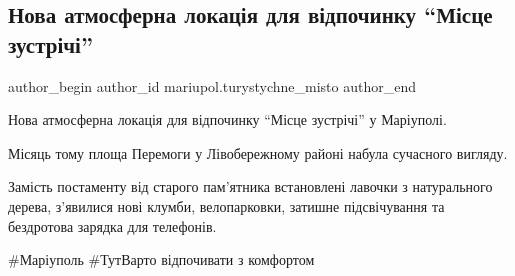  
 
 
 
 

\subsection{Нова атмосферна локація для відпочинку \enquote{Місце зустрічі}}
\label{sec:21_10_2021.fb.mariupol.turystychne_misto.1.nova_atmosferna_lokacia_misce_zustrichi}

\ifcmt
 author_begin
   author_id mariupol.turystychne_misto
 author_end
\fi

Нова атмосферна локація для відпочинку \enquote{Місце зустрічі} у Маріуполі. 

Місяць тому площа Перемоги у Лівобережному районі набула сучасного вигляду.

Замість постаменту від старого пам'ятника встановлені лавочки з натурального
дерева, з'явилися нові клумби, велопарковки, затишне підсвічування та
бездротова зарядка для телефонів.

\#Маріуполь \#ТутВарто відпочивати з комфортом
